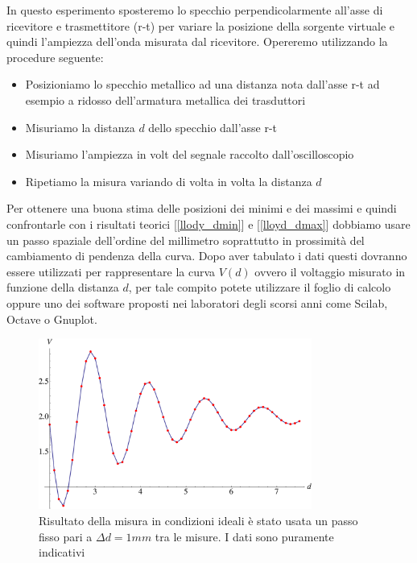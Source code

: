 \documentclass[a4paper,10pt,oneside]{article}
\begin{document}
In questo esperimento sposteremo lo specchio perpendicolarmente all'asse di ricevitore e trasmettitore (r-t) per variare la posizione della sorgente virtuale e quindi l'ampiezza dell'onda misurata dal ricevitore. Opereremo utilizzando la procedure seguente:
\begin{itemize}
 \item Posizioniamo lo specchio metallico ad una distanza nota dall'asse r-t ad esempio a ridosso dell'armatura metallica dei trasduttori
\item Misuriamo la distanza $d$ dello specchio dall'asse r-t
\item Misuriamo l'ampiezza in volt del segnale raccolto dall'oscilloscopio
\item Ripetiamo la misura variando di volta in volta la distanza $d$ 
\end{itemize}

Per ottenere una buona stima delle posizioni dei minimi e dei massimi e quindi confrontarle con i risultati teorici [\ref{llody_dmin}] e [\ref{lloyd_dmax}] dobbiamo usare un passo spaziale dell'ordine del millimetro  soprattutto in prossimità del cambiamento di pendenza della curva. Dopo aver tabulato i dati questi dovranno essere utilizzati per rappresentare la curva $V(d)$ ovvero il voltaggio misurato in funzione della distanza $d$, per tale compito potete utilizzare il foglio di calcolo oppure uno dei software proposti nei laboratori degli scorsi anni come Scilab, Octave o Gnuplot.


\begin{figure}[H]
 \centering
 \includegraphics[width=0.8\textwidth]{../Immagini/esempio_misura_lloyd.pdf}
 \caption{Risultato della misura in condizioni ideali è stato usata un passo fisso pari a $\Delta d=1mm$ tra le misure. I dati sono puramente indicativi}
 \label{fig:misura_llody}
\end{figure}
\end{document}
